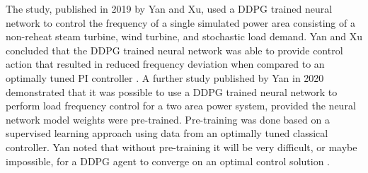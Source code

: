 The study, published in 2019 by Yan and Xu, used a DDPG trained neural network to control the frequency of a single simulated power area consisting of a non-reheat steam turbine, wind turbine, and stochastic load demand. Yan and Xu concluded that the DDPG trained neural network was able to provide control action that resulted in reduced frequency deviation when compared to an optimally tuned PI controller \cite{Yan2019}. A further study published by Yan in 2020 demonstrated that it was possible to use a DDPG trained neural network to perform load frequency control for a two area power system, provided the neural network model weights were pre-trained. Pre-training was done based on a supervised learning approach using data from an optimally tuned classical controller. Yan noted that without pre-training it will be very difficult, or maybe impossible, for a DDPG agent to converge on an optimal control solution \cite{Yan2020}.

